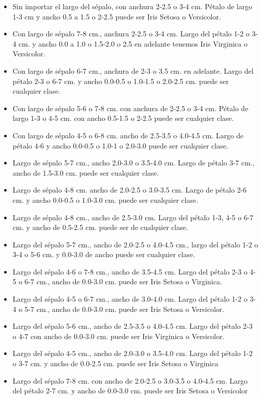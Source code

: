 \documentclass[a4paper,10pt]{article}
\begin{document}
\begin{itemize}
 \item Sin importar el largo del sépalo, con anchura 2-2.5 o 3-4 cm. Pétalo de largo 1-3 cm y ancho 0.5 a 1.5 o 2-2.5 puede ser Iris Setosa o Versicolor.   
 \item Con largo de sépalo 7-8 cm., anchura 2-2.5 o 3-4 cm. Largo del pétalo 1-2 o 3-4  cm. y ancho 0.0 a 1.0 o 1.5-2.0 o 2.5 en adelante 
 tenemos Iris Virginica o Versicolor.
 \item Con largo de sépalo 6-7 cm., anchura de 2-3 o 3.5 cm. en adelante. Largo del pétalo 2-3 o 6-7 cm. y ancho 0.0-0.5 o 1.0-1.5 o 2.0-2.5 cm. 
 puede ser cualquier clase.
 \item Con largo de sépalo 5-6 o 7-8 cm. con anchura de 2-2.5 o 3-4 cm. Pétalo de largo 1-3 o 4-5 cm. con ancho 0.5-1.5 o 2-2.5 puede ser cualquier clase. 
 \item Con largo de sépalo 4-5 o 6-8 cm. ancho de 2.5-3.5 o 4.0-4.5 cm. Largo de pétalo 4-6 y ancho 0.0-0.5 o 1.0-1 o 2.0-3.0 puede ser cualquier clase.
 \item Largo de sépalo 5-7 cm., ancho 2.0-3.0 o 3.5-4.0 cm. Largo de pétalo 3-7 cm., ancho de 1.5-3.0 cm. puede ser cualquier clase.
 \item Largo de sépalo 4-8 cm. ancho de  2.0-2.5 o 3.0-3.5 cm. Largo de pétalo 2-6 cm. y ancho 0.0-0.5 o 1.0-3.0 cm. puede ser cualquier clase.
 \item Largo de sépalo 4-8 cm., ancho de 2.5-3.0 cm. Largo del pétalo 1-3, 4-5 o 6-7  cm. y ancho de 0.5-2.5 cm. puede ser de cualquier clase.
 \item Largo del sépalo 5-7 cm., ancho de 2.0-2.5 o 4.0-4.5 cm., largo del pétalo 1-2 o 3-4 o 5-6 cm. y 0.0-3.0 de ancho puede ser cualquier clase.
 \item Largo del sépalo 4-6 o 7-8 cm., ancho de 3.5-4.5 cm. Largo del pétalo 2-3 o 4-5 o 6-7 cm., ancho de 0.0-3.0 cm. puede ser Iris Setosa o Virginica.
 \item Largo del sépalo 4-5 o 6-7 cm., ancho de 3.0-4.0 cm. Largo del pétalo 1-2 o 3-4 o 5-7 cm., ancho de 0.0-3.0 cm. puede ser Iris Setosa o Versicolor.
 \item Largo del sépalo 5-6 cm., ancho de 2.5-3.5 o 4.0-4.5 cm. Largo del pétalo 2-3 o 4-7 con ancho de 0.0-3.0 cm. puede ser Iris Virginica o Versicolor.
 \item Largo del sépalo 4-5 cm., ancho de 2.0-3.0 o 3.5-4.0 cm. Largo del pétalo 1-2 o 3-7 cm. y ancho de 0.0-2.5 cm. puede ser Iris Setosa o Virginica
 \item Largo del sépalo 7-8 cm. con ancho de  2.0-2.5 o 3.0-3.5 o 4.0-4.5 cm. Largo del pétalo 2-7 cm. y ancho de 0.0-3.0 cm. puede ser Iris Setosa o Versicolor

\end{itemize}
\end{document}

